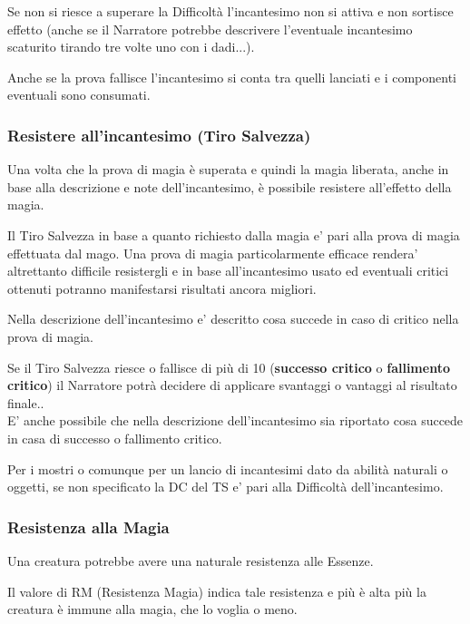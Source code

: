 Se non si riesce a superare la Difficoltà l'incantesimo non si attiva e non sortisce effetto (anche se il Narratore potrebbe descrivere l'eventuale incantesimo scaturito tirando tre volte uno con i dadi...).

Anche se la prova fallisce l'incantesimo si conta tra quelli lanciati e i componenti eventuali sono consumati.

\subsubsection{Resistere all'incantesimo (Tiro Salvezza)}

\label{resistere-allessenza-tiro-salvezza}

Una volta che la prova di magia è superata e quindi la magia liberata, anche in base alla descrizione e note dell'incantesimo, è possibile resistere all'effetto della magia.

Il Tiro Salvezza in base a quanto richiesto dalla magia e' pari alla prova di magia effettuata dal mago. Una prova di magia particolarmente efficace rendera' altrettanto difficile resistergli e in base all'incantesimo usato ed eventuali critici ottenuti potranno manifestarsi risultati ancora migliori.

Nella descrizione dell'incantesimo e' descritto cosa succede in caso di critico nella prova di magia.

Se il Tiro Salvezza riesce o fallisce di più di 10 (\textbf{successo critico} o \textbf{fallimento critico}) il Narratore potrà decidere di applicare svantaggi o vantaggi al risultato finale..\\
E' anche possibile che nella descrizione dell'incantesimo sia riportato cosa succede in casa di successo o fallimento critico.

Per i mostri o comunque per un lancio di incantesimi dato da abilità naturali o oggetti, se non specificato la DC del TS e' pari alla Difficoltà dell'incantesimo.

\subsubsection{Resistenza alla Magia}

Una creatura potrebbe avere una naturale resistenza alle Essenze.

Il valore di RM (Resistenza Magia) indica tale resistenza e più è alta più la creatura è immune alla magia, che lo voglia o meno.


